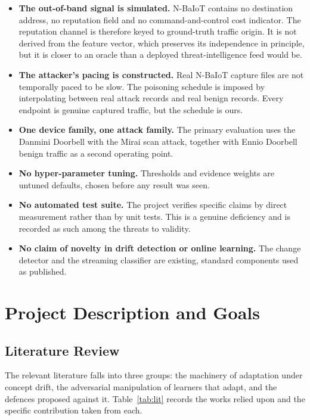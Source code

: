 \documentclass[12pt,a4paper]{report}
\begin{document}
\begin{itemize}[leftmargin=*,itemsep=4pt]
\item \textbf{The out-of-band signal is simulated.} N-BaIoT contains no
destination address, no reputation field and no command-and-control cost
indicator. The reputation channel is therefore keyed to ground-truth traffic
origin. It is not derived from the feature vector, which preserves its
independence in principle, but it is closer to an oracle than a deployed
threat-intelligence feed would be.
\item \textbf{The attacker's pacing is constructed.} Real N-BaIoT capture files
are not temporally paced to be slow. The poisoning schedule is imposed by
interpolating between real attack records and real benign records. Every
endpoint is genuine captured traffic, but the schedule is ours.
\item \textbf{One device family, one attack family.} The primary evaluation uses
the Danmini Doorbell with the Mirai scan attack, together with Ennio Doorbell
benign traffic as a second operating point.
\item \textbf{No hyper-parameter tuning.} Thresholds and evidence weights are
untuned defaults, chosen before any result was seen.
\item \textbf{No automated test suite.} The project verifies specific claims by
direct measurement rather than by unit tests. This is a genuine deficiency and
is recorded as such among the threats to validity.
\item \textbf{No claim of novelty in drift detection or online learning.} The
change detector and the streaming classifier are existing, standard components
used as published.
\end{itemize}

\chapter{Project Description and Goals}

\section{Literature Review}

The relevant literature falls into three groups: the machinery of adaptation
under concept drift, the adversarial manipulation of learners that adapt, and
the defences proposed against it. Table~\ref{tab:lit} records the works relied
upon and the specific contribution taken from each.
\end{document}
